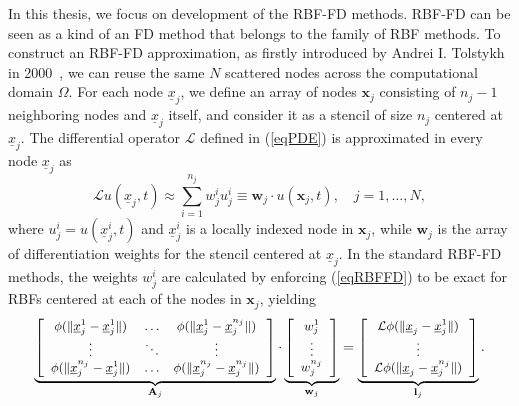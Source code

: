 \documentclass{UUThesisTemplate}
\begin{document}
\par
In this thesis, we focus on development of the RBF-FD methods. RBF-FD can be seen as a kind of an FD method that belongs to the family of RBF methods. To construct an RBF-FD approximation, as firstly introduced by Andrei I. Tolstykh in 2000~\cite{tolstykh2000using}, we can reuse the same $N$ scattered nodes across the computational domain $\Omega$. For each node $\underline{x}_j$, we define an array of nodes $\mathbf{x}_j$ consisting of $n_j-1$ neighboring nodes and $\underline{x}_j$ itself, and consider it as a stencil of size $n_j$ centered at $\underline{x}_j$. The differential operator $\mathcal{L}$ defined in (\ref{eqPDE})  is approximated in every node  $\underline{x}_j$ as
\begin{equation}
\mathcal{L}u(\underline{x}_j, t)\approx\sum_{i=1}^{n_j}{w}_{j}^{i}u_j^{i}\equiv \mathbf{w}_j\cdot u(\mathbf{x}_j, t),\quad j=1,\ldots,N,
\label{eqRBFFD}
\end{equation}
where $u_j^{i}=u(\underline{x}_j^i,t)$ and $\underline{x}_j^i$ is a locally indexed node in $\mathbf{x}_j$, while $\mathbf{w}_j$ is the array of differentiation weights for the stencil centered at $\underline{x}_j$. In the standard RBF-FD methods, the weights ${w}_j^i$ are calculated by enforcing (\ref{eqRBFFD}) to be exact for RBFs centered at each of the nodes in $\mathbf{x}_j$, yielding
\begin{equation}
\label{eqRBFFDmat}
{\footnotesize{
\underbrace{\left[\begin{array}{cccc}
\phi(\|\underline{x}_j^{1}-\underline{x}_j^{1}\|) & \ldots & \phi(\|\underline{x}_j^{1}-\underline{x}_{j}^{n_j}\|)\\
\vdots & \ddots & \vdots\\
\phi(\|\underline{x}_{j}^{n_j}-\underline{x}_j^{1}\|) & \ldots & \phi(\|\underline{x}_{j}^{n_j}-\underline{x}_{j}^{n_j}\|)
\end{array}\right]}_{\mathbf{A}_j}
\cdot \underbrace{\left[\begin{array}{c}
{w}_j^{1}\\
\vdots\\
{w}_{j}^{n_j}
\end{array}\right]}_{\mathbf{w}_j}=
\underbrace{\left[\begin{array}{c}
\mathcal{L}\phi(\|\underline{x}_{j}-\underline{x}_j^{1}\|)\\
\vdots \\
\mathcal{L}\phi(\|\underline{x}_{j}-\underline{x}_{{j}}^{n_j}\|)
\end{array}\right]}_{\mathbf{l}_j}.}}
\end{equation}
\end{document}

